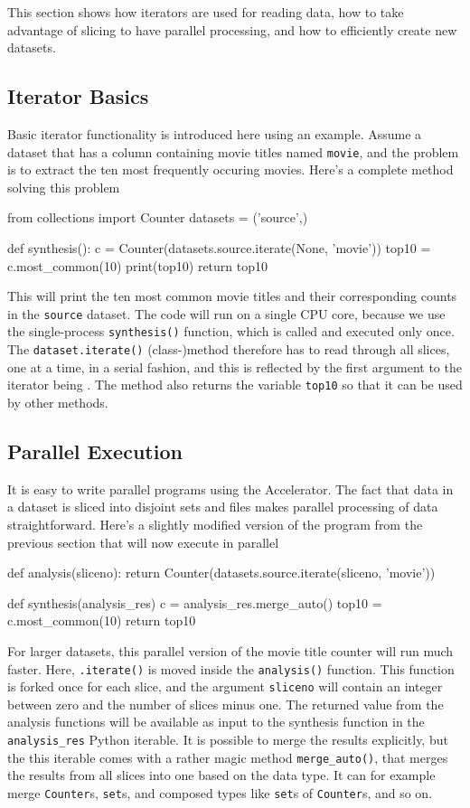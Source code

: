 This section shows how iterators are used for reading data, how to
take advantage of slicing to have parallel processing, and how to
efficiently create new datasets.


\subsection{Iterator Basics}

Basic iterator functionality is introduced here using an example.
Assume a dataset that has a column containing movie titles named
\texttt{movie}, and the problem is to extract the ten most frequently
occuring movies.  Here's a complete method solving this problem
\begin{python}
from collections import Counter
datasets = ('source',)

def synthesis():
    c = Counter(datasets.source.iterate(None, 'movie'))
    top10 = c.most_common(10)
    print(top10)
    return top10
\end{python}
This will print the ten most common movie titles and their
corresponding counts in the \texttt{source} dataset.  The code will
run on a single CPU core, because we use the single-process
\texttt{synthesis()} function, which is called and executed only once.
The \texttt{dataset.iterate()} (class-)method therefore has to read
through all slices, one at a time, in a serial fashion, and this is
reflected by the first argument to the iterator being \pyNone.  The
method also returns the variable \texttt{top10} so that it can be used
by other methods.



\subsection{Parallel Execution}
It is easy to write parallel programs using the Accelerator.  The fact
that data in a dataset is sliced into disjoint sets and files makes
parallel processing of data straightforward.  Here's a slightly
modified version of the program from the previous section that will
now execute in parallel
\begin{python}
def analysis(sliceno):
    return Counter(datasets.source.iterate(sliceno, 'movie'))

def synthesis(analysis_res)
    c = analysis_res.merge_auto()
    top10 = c.most_common(10)
    return top10
\end{python}
For larger datasets, this parallel version of the movie title counter
will run much faster.  Here, \texttt{.iterate()} is moved inside the
\texttt{analysis()} function.  This function is forked once for each
slice, and the argument \texttt{sliceno} will contain an integer
between zero and the number of slices minus one.  The returned value
from the analysis functions will be available as input to the
synthesis function in the \texttt{analysis\_res} Python iterable.  It
is possible to merge the results explicitly, but the this iterable
comes with a rather magic method \texttt{merge\_auto()}, that merges
the results from all slices into one based on the data type.  It can
for example merge \texttt{Counter}s, \texttt{set}s, and composed types
like \texttt{set}s of \texttt{Counter}s, and so on.


